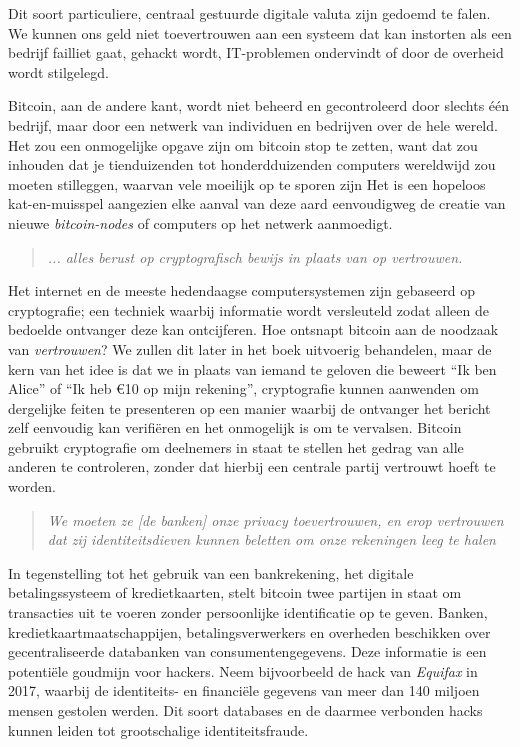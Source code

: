 Dit soort particuliere, centraal gestuurde digitale valuta zijn gedoemd te falen. We kunnen ons geld niet toevertrouwen aan een systeem dat kan instorten als een bedrijf failliet gaat, gehackt wordt, IT-problemen ondervindt of door de overheid wordt stilgelegd.

Bitcoin, aan de andere kant, wordt niet beheerd en gecontroleerd door slechts één bedrijf, maar door een netwerk van individuen en bedrijven over de hele wereld. Het zou een onmogelijke opgave zijn om bitcoin stop te zetten, want dat zou inhouden dat je tienduizenden tot honderdduizenden computers wereldwijd zou moeten stilleggen, waarvan vele moeilijk op te sporen zijn Het is een hopeloos kat-en-muisspel aangezien elke aanval van deze aard eenvoudigweg de creatie van nieuwe \textit{bitcoin-nodes} of computers op het netwerk aanmoedigt.

\begin{quote}
\textit{ ... alles berust op cryptografisch bewijs in plaats van op vertrouwen.}
\end{quote}

Het internet en de meeste hedendaagse computersystemen zijn gebaseerd op cryptografie; een techniek waarbij informatie wordt versleuteld zodat alleen de bedoelde ontvanger deze kan ontcijferen. Hoe ontsnapt bitcoin aan de noodzaak van \textit{vertrouwen}? We zullen dit later in het boek uitvoerig behandelen, maar de kern van het idee is dat we in plaats van iemand te geloven die beweert ``Ik ben Alice'' of ``Ik heb €10 op mijn rekening'', cryptografie kunnen aanwenden om dergelijke feiten te presenteren op een manier waarbij de ontvanger het bericht zelf eenvoudig kan verifiëren en het onmogelijk is om te vervalsen. Bitcoin gebruikt cryptografie om deelnemers in staat te stellen het gedrag van alle anderen te controleren, zonder dat hierbij een centrale partij vertrouwt hoeft te worden.

\begin{quote}
\textit{We moeten ze [de banken] onze privacy toevertrouwen, en erop vertrouwen dat zij identiteitsdieven kunnen beletten om onze rekeningen leeg te halen}
\end{quote}

In tegenstelling tot het gebruik van een bankrekening, het digitale betalingssysteem of kredietkaarten, stelt bitcoin twee partijen in staat om transacties uit te voeren zonder persoonlijke identificatie op te geven. Banken, kredietkaartmaatschappijen, betalingsverwerkers en overheden beschikken over gecentraliseerde databanken van consumentengegevens. Deze informatie is een potentiële goudmijn voor hackers. Neem bijvoorbeeld de hack van \textit{Equifax} in 2017, waarbij de identiteits- en financiële gegevens van meer dan 140 miljoen mensen gestolen werden. Dit soort databases en de daarmee verbonden hacks kunnen leiden tot grootschalige identiteitsfraude.

